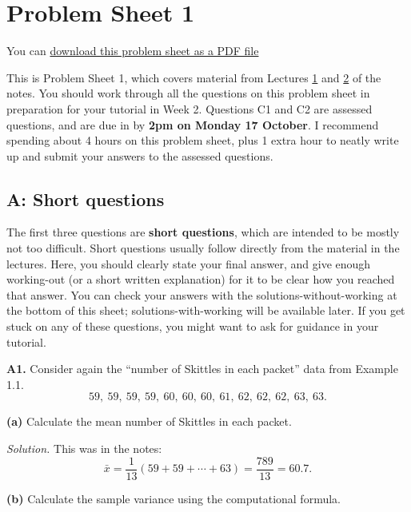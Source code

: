 \documentclass[
  a4paper,
]{book}
\newif\ifcomm\commtrue
\theoremstyle{definition}
\theoremstyle{definition}
\theoremstyle{definition}
\theoremstyle{definition}
\theoremstyle{remark}
\begin{document}
\hypertarget{P1}{%
\chapter*{Problem Sheet 1}\label{P1}}

\commfalse

You can \href{P1-sheet.pdf}{download this problem sheet as a PDF file}

This is Problem Sheet 1, which covers material from Lectures \protect\hyperlink{L01-stats}{1} and \protect\hyperlink{L02-dataviz}{2} of the notes. You should work through all the questions on this problem sheet in preparation for your tutorial in Week 2. Questions C1 and C2 are assessed questions, and are due in by \textbf{2pm on Monday 17 October}. I recommend spending about 4 hours on this problem sheet, plus 1 extra hour to neatly write up and submit your answers to the assessed questions.

\hypertarget{P1-short}{%
\section*{A: Short questions}\label{P1-short}}

The first three questions are \textbf{short questions}, which are intended to be mostly not too difficult. Short questions usually follow directly from the material in the lectures. Here, you should clearly state your final answer, and give enough working-out (or a short written explanation) for it to be clear how you reached that answer. You can check your answers with the solutions-without-working at the bottom of this sheet; solutions-with-working will be available later. If you get stuck on any of these questions, you might want to ask for guidance in your tutorial.

\textbf{A1.} Consider again the ``number of Skittles in each packet'' data from Example 1.1.
\[ 59, \ 59, \ 59, \ 59, \ 60, \ 60, \ 60, \ 61, \ 62, \ 62, \ 62, \ 63, \ 63 .\]

\textbf{(a)} Calculate the mean number of Skittles in each packet.

\begin{myanswers}
\emph{Solution.} This was in the notes:
\[ \bar x = \frac{1}{13} (59 + 59 + \cdots + 63) =  \frac{789}{13} = 60.7 .\]

\end{myanswers}

\textbf{(b)} Calculate the sample variance using the computational formula.
\end{document}
